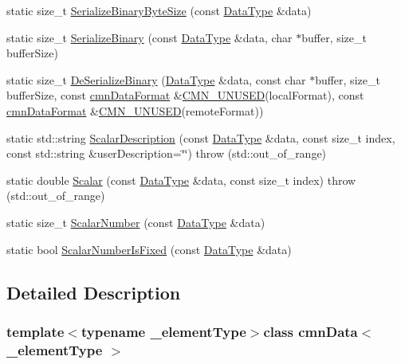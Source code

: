 \begin{DoxyCompactItemize}
static size\+\_\+t \hyperlink{classcmn_data_a131f5c0465a4985ba49c1cf439a267db}{Serialize\+Binary\+Byte\+Size} (const \hyperlink{classcmn_data_a353bd6bb0af651b6301e5e2e34587da2}{Data\+Type} \&data)
\item 
static size\+\_\+t \hyperlink{classcmn_data_ac37ebe9acb11686388b664aa70612dc2}{Serialize\+Binary} (const \hyperlink{classcmn_data_a353bd6bb0af651b6301e5e2e34587da2}{Data\+Type} \&data, char $\ast$buffer, size\+\_\+t buffer\+Size)
\item 
static size\+\_\+t \hyperlink{classcmn_data_a27952f4dad3883899b9937e5da7ca646}{De\+Serialize\+Binary} (\hyperlink{classcmn_data_a353bd6bb0af651b6301e5e2e34587da2}{Data\+Type} \&data, const char $\ast$buffer, size\+\_\+t buffer\+Size, const \hyperlink{classcmn_data_format}{cmn\+Data\+Format} \&\hyperlink{cmn_portability_8h_a021894e2626935fa2305434b1e893ff6}{C\+M\+N\+\_\+\+U\+N\+U\+S\+E\+D}(local\+Format), const \hyperlink{classcmn_data_format}{cmn\+Data\+Format} \&\hyperlink{cmn_portability_8h_a021894e2626935fa2305434b1e893ff6}{C\+M\+N\+\_\+\+U\+N\+U\+S\+E\+D}(remote\+Format))
\item 
static std\+::string \hyperlink{classcmn_data_a5ab3b53a2f3dbd50aea5679b79c8c572}{Scalar\+Description} (const \hyperlink{classcmn_data_a353bd6bb0af651b6301e5e2e34587da2}{Data\+Type} \&data, const size\+\_\+t index, const std\+::string \&user\+Description=\char`\"{}\char`\"{})  throw (std\+::out\+\_\+of\+\_\+range)
\item 
static double \hyperlink{classcmn_data_a6d0e906147e388ba5f245fa8f66d209f}{Scalar} (const \hyperlink{classcmn_data_a353bd6bb0af651b6301e5e2e34587da2}{Data\+Type} \&data, const size\+\_\+t index)  throw (std\+::out\+\_\+of\+\_\+range)
\item 
static size\+\_\+t \hyperlink{classcmn_data_a30975db5a942d765a0e8ca87eb8d52ad}{Scalar\+Number} (const \hyperlink{classcmn_data_a353bd6bb0af651b6301e5e2e34587da2}{Data\+Type} \&data)
\item 
static bool \hyperlink{classcmn_data_ab09499aad5268ac49856006456513e6d}{Scalar\+Number\+Is\+Fixed} (const \hyperlink{classcmn_data_a353bd6bb0af651b6301e5e2e34587da2}{Data\+Type} \&data)
\end{DoxyCompactItemize}


\subsection{Detailed Description}
\subsubsection*{template$<$typename \+\_\+element\+Type$>$class cmn\+Data$<$ \+\_\+element\+Type $>$}

